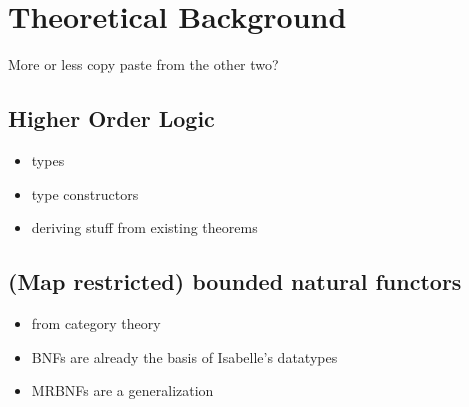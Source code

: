\chapter{Theoretical Background}

More or less copy paste from the other two?

\section{Higher Order Logic}

\begin{itemize}
\item{types}
\item{type constructors}
\item{deriving stuff from existing theorems}
\end{itemize}

\section{(Map restricted) bounded natural functors}

\begin{itemize}
\item{from category theory}
\item{BNFs are already the basis of Isabelle's datatypes}
\item{MRBNFs are a generalization}
\end{itemize}
